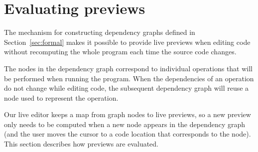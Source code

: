 \documentclass[acmsmall,anonymous,fleqn]{acmart}\settopmatter{printfolios=false,printccs=false,printacmref=false}
\theoremstyle{plain}
\theoremstyle{definition}
\begin{document}

\section{Evaluating previews}
\label{sec:previews}

The mechanism for constructing dependency graphs defined in Section~\ref{sec:formal} makes it
possible to provide live previews when editing code without recomputing the whole program
each time the source code changes.

The nodes in the dependency graph correspond to individual operations that will be performed
when running the program. When the dependencies of an operation do not change while editing
code, the subsequent dependency graph will reuse a node used to represent the operation.

Our live editor keeps a map from graph nodes to live previews, so a new preview only needs to be
computed when a new node appears in the dependency graph (and the user moves the cursor to a
code location that corresponds to the node). This section describes how previews are evaluated.


\end{document}
